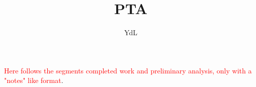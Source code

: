 \documentclass[onecolumn,fleqn]{revtex4}
\newcommand{\rmrk}[1]{\textcolor{red}{#1}}
\begin{document}
\title{PTA}

\author{YdL}



\rmrk{Here follows the segments completed work and
preliminary analysis, only with a "notes" like format}.



\end{document}
